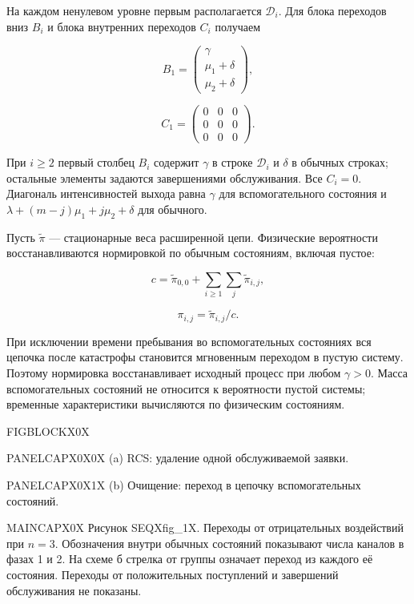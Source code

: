 На каждом ненулевом уровне первым располагается \(\mathcal D_i\). Для блока переходов вниз \(B_i\) и блока внутренних переходов \(C_i\) получаем


\[B_1=\begin{pmatrix}\gamma\\\mu_1+\delta\\\mu_2+\delta\end{pmatrix},\]

\[C_1=\begin{pmatrix}0&0&0\\0&0&0\\0&0&0\end{pmatrix}.\]


При \(i\ge2\) первый столбец \(B_i\) содержит \(\gamma\) в строке \(\mathcal D_i\) и \(\delta\) в обычных строках; остальные элементы задаются завершениями обслуживания. Все \(C_i=0\). Диагональ интенсивностей выхода равна \(\gamma\) для вспомогательного состояния и \(\lambda+(m-j)\mu_1+j\mu_2+\delta\) для обычного.

Пусть \(\widetilde\pi\) --- стационарные веса расширенной цепи. Физические вероятности восстанавливаются нормировкой по обычным состояниям, включая пустое:


\[c=\widetilde\pi_{0,0}+\sum_{i\ge1}\sum_j\widetilde\pi_{i,j},\]

\[\pi_{i,j}=\widetilde\pi_{i,j}/c.\]


При исключении времени пребывания во вспомогательных состояниях вся цепочка после катастрофы становится мгновенным переходом в пустую систему. Поэтому нормировка восстанавливает исходный процесс при любом \(\gamma>0\). Масса вспомогательных состояний не относится к вероятности пустой системы; временные характеристики вычисляются по физическим состояниям.

\noindent FIGBLOCKX0X\par

\noindent PANELCAPX0X0X (a) RCS: удаление одной обслуживаемой заявки.\par

\noindent PANELCAPX0X1X (b) Очищение: переход в цепочку вспомогательных состояний.\par

\noindent MAINCAPX0X Рисунок SEQXfig_1X. Переходы от отрицательных воздействий при \(n=3\). Обозначения внутри обычных состояний показывают числа каналов в фазах 1 и 2. На схеме б стрелка от группы означает переход из каждого её состояния. Переходы от положительных поступлений и завершений обслуживания не показаны.\par



